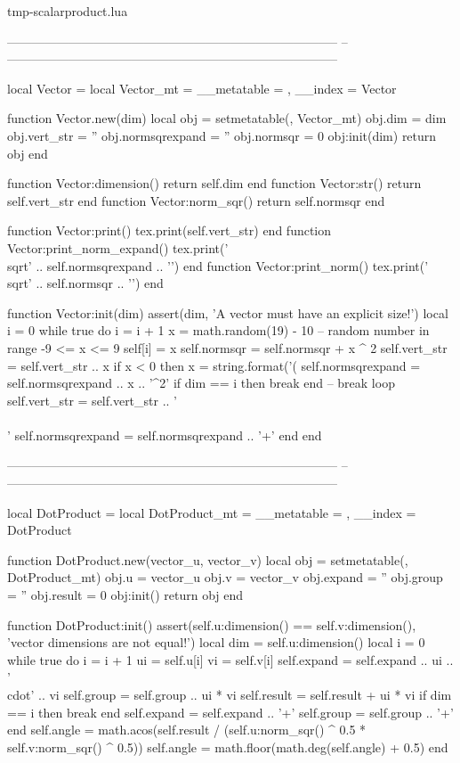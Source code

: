 \RequirePackage{filecontents}
\begin{filecontents*}{tmp-scalarproduct.lua}

--------------------------------------------------------------------------------
--
--------------------------------------------------------------------------------

local Vector = {}
local Vector_mt = { __metatable = {}, __index = Vector }

function Vector.new(dim)
   local obj = setmetatable({}, Vector_mt)
   obj.dim = dim
   obj.vert_str = ''
   obj.normsqrexpand = ''
   obj.normsqr = 0
   obj:init(dim)
   return obj
end

function Vector:dimension() return self.dim end
function Vector:str() return self.vert_str end
function Vector:norm_sqr() return self.normsqr end

function Vector:print() tex.print(self.vert_str) end
function Vector:print_norm_expand() tex.print('\\sqrt{' .. self.normsqrexpand .. '}') end
function Vector:print_norm() tex.print('\\sqrt{' .. self.normsqr .. '}') end

function Vector:init(dim) 
   assert(dim, 'A vector must have an explicit size!')
   local i = 0
   while true do
      i = i + 1
      x = math.random(19) - 10                                 -- random number in range -9 <= x <= 9
      self[i] = x
      self.normsqr = self.normsqr + x ^ 2
      self.vert_str = self.vert_str .. x
      if x < 0 then x = string.format('(%
      self.normsqrexpand = self.normsqrexpand .. x .. '^2'
      if dim == i then break end                               -- break loop
      self.vert_str = self.vert_str .. '\\\\'
      self.normsqrexpand = self.normsqrexpand .. '+'
   end
end

--------------------------------------------------------------------------------
--
--------------------------------------------------------------------------------

local DotProduct = {}
local DotProduct_mt = { __metatable = {}, __index = DotProduct }

function DotProduct.new(vector_u, vector_v)
   local obj = setmetatable({}, DotProduct_mt)
   obj.u = vector_u
   obj.v = vector_v
   obj.expand = ''
   obj.group = ''
   obj.result = 0
   obj:init()
   return obj
end

function DotProduct:init()
   assert(self.u:dimension() == self.v:dimension(), 'vector dimensions are not equal!')
   local dim = self.u:dimension()
   local i = 0
   while true do
      i = i + 1
      ui = self.u[i]
      vi = self.v[i]
      self.expand = self.expand .. ui .. '\\cdot' .. vi
      self.group = self.group .. ui * vi
      self.result = self.result + ui * vi
      if dim == i then break end
      self.expand = self.expand .. '+'
      self.group = self.group .. '+'
   end
   self.angle = math.acos(self.result / (self.u:norm_sqr() ^ 0.5 * self.v:norm_sqr() ^ 0.5))
   self.angle = math.floor(math.deg(self.angle) + 0.5)
end


\end{filecontents*}
